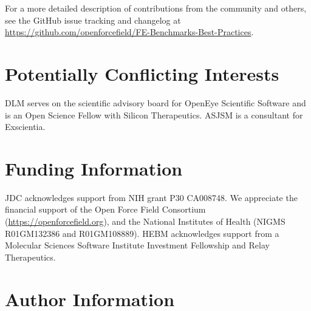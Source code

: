\documentclass[9pt,bestpractices]{livecoms}
\newcommand{\githubrepository}{\url{https://github.com/openforcefield/FE-Benchmarks-Best-Practices}}  %
\begin{document}
For a more detailed description of contributions from the community and others, see the GitHub issue tracking and changelog at \githubrepository.

\section{Potentially Conflicting Interests}

DLM serves on the scientific advisory board for OpenEye Scientific Software and is an Open Science Fellow with Silicon Therapeutics.
ASJSM is a consultant for Exscientia. 
\section{Funding Information}
JDC acknowledges support from NIH grant P30 CA008748.
We appreciate the financial support of the Open Force Field Consortium (\url{https://openforcefield.org}), and the National Institutes of Health (NIGMS R01GM132386 and R01GM108889).
HEBM acknowledges support from a Molecular Sciences Software Institute Investment Fellowship and Relay Therapeutics. 


\section*{Author Information}
\makeorcid




\end{document}
